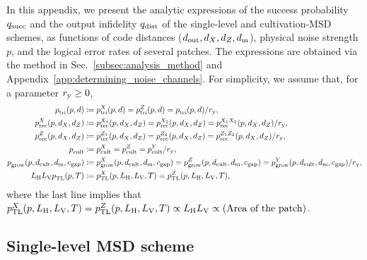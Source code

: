 \documentclass[
 prx,
 reprint,
 superscriptaddress,
 longbibliography,
 dvipsnames
]{revtex4-2}
\begin{document}
\begin{widetext}
In this appendix, we present the analytic expressions of the success probability $q_{\mathrm{succ}}$ and the output infidelity $q_{\mathrm{dist}}$ of the single-level and cultivation-MSD schemes, as functions of code distances ($d_{\mathrm{out}}, {d_X}, {d_Z}, d_{\mathrm{m}}$), physical noise strength $p$, and the logical error rates of several patches.
The expressions are obtained via the method in Sec.~\ref{subsec:analysis_method} and Appendix~\ref{app:determining_noise_channels}.
For simplicity, we assume that, for a parameter $r_{\mathrm{y}} \geq 0$,
\begin{align*}
    p_{\mathrm{tri}}^{}(p, d) &\coloneqq p_{\mathrm{tri}}^{X}(p, d) = p_{\mathrm{tri}}^{Z}(p, d) = p_{\mathrm{tri}}^{}(p, d) / r_{\mathrm{y}}, \\
    p_{\mathrm{rec}}^{X}(p, {d_X}, {d_Z}) &\coloneqq p_{\mathrm{rec}}^{X_1}(p, {d_X}, {d_Z}) = p_{\mathrm{rec}}^{X_2}(p, {d_X}, {d_Z}) = p_{\mathrm{rec}}^{X_1 X_2}(p, {d_X}, {d_Z}) / r_{\mathrm{y}}, \\
     p_{\mathrm{rec}}^{Z}(p, {d_X}, {d_Z}) &\coloneqq p_{\mathrm{rec}}^{Z_1}(p, {d_X}, {d_Z}) = p_{\mathrm{rec}}^{Z_2}(p, {d_X}, {d_Z}) = p_{\mathrm{rec}}^{Z_1 Z_2}(p, {d_X}, {d_Z}) / r_{\mathrm{y}}, \\
     p_{\mathrm{cult}}^{} &\coloneqq p_{\mathrm{cult}}^{X} = p_{\mathrm{cult}}^{Z} = p_{\mathrm{cult}}^{Y} / r_{\mathrm{y}}, \\
     p_{\mathrm{grow}}^{}(p, d_\mathrm{cult}, d_{\mathrm{m}}, c_{\mathrm{gap}}) &\coloneqq p_{\mathrm{grow}}^{X}(p, d_\mathrm{cult}, d_{\mathrm{m}}, c_{\mathrm{gap}}) = p_{\mathrm{grow}}^{Z}(p, d_\mathrm{cult}, d_{\mathrm{m}}, c_{\mathrm{gap}}) = p_{\mathrm{grow}}^{Y}(p, d_\mathrm{cult}, d_{\mathrm{m}}, c_{\mathrm{gap}}) / r_{\mathrm{y}}, \\
     L_{\mathrm{H}} L_{\mathrm{V}} p_{\mathrm{TL}}^{} (p, T) &\coloneqq p_{\mathrm{TL}}^{X}(p, L_{\mathrm{H}}, L_{\mathrm{V}}, T) = p_{\mathrm{TL}}^{Z}(p, L_{\mathrm{H}}, L_{\mathrm{V}}, T),
\end{align*}
where the last line implies that $p_{\mathrm{TL}}^{X}(p, L_{\mathrm{H}}, L_{\mathrm{V}}, T) = p_{\mathrm{TL}}^{Z}(p, L_{\mathrm{H}}, L_{\mathrm{V}}, T) \propto L_{\mathrm{H}} L_{\mathrm{V}} \propto \text{(Area of the patch)}$.

\subsection{Single-level MSD scheme \label{subsec:analytic_expression_sng}}


\end{widetext}
\end{document}
